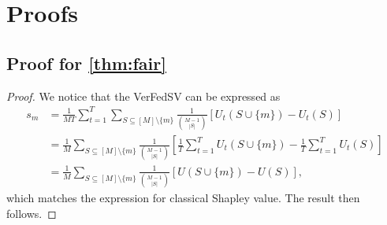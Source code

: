 \section{Proofs} \label{sec:8-10}

\subsection{Proof for \autoref{thm:fair}}
\begin{proof}
    We notice that the VerFedSV can be expressed as 
    \begin{align*}
        s_m &= \frac{1}{MT}\sum_{t=1}^T\sum_{S \subseteq [M] \setminus \{m\}} \frac{1}{\binom{M-1}{|S|}} [U_t(S\cup\{m\}) - U_t(S)]\\
        &= \frac{1}{M}\sum_{S \subseteq [M] \setminus \{m\}} \frac{1}{\binom{M-1}{|S|}} \left[\frac{1}{T}\sum_{t=1}^T U_t(S\cup\{m\}) - \frac{1}{T}\sum_{t=1}^T U_t(S)\right]\\
        &= \frac{1}{M}\sum_{S \subseteq [M] \setminus \{m\}} \frac{1}{\binom{M-1}{|S|}} \left[U(S\cup\{m\}) - U(S)\right],
    \end{align*}
    which matches the expression for classical Shapley value. The result then follows. 
\end{proof}

